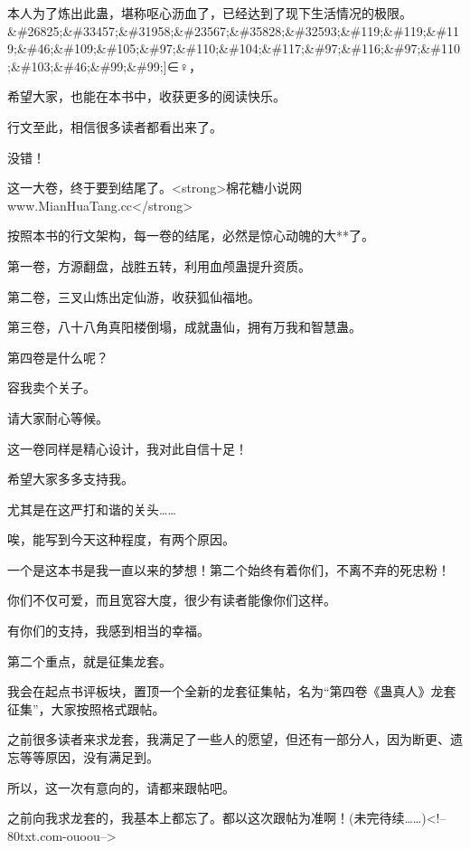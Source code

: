 \begin{this_body}
本人为了炼出此蛊，堪称呕心沥血了，已经达到了现下生活情况的极限。\&\#26825;\&\#33457;\&\#31958;\&\#23567;\&\#35828;\&\#32593;\&\#119;\&\#119;\&\#119;\&\#46;\&\#109;\&\#105;\&\#97;\&\#110;\&\#104;\&\#117;\&\#97;\&\#116;\&\#97;\&\#110;\&\#103;\&\#46;\&\#99;\&\#99;]∈♀，

希望大家，也能在本书中，收获更多的阅读快乐。

行文至此，相信很多读者都看出来了。

没错！

这一大卷，终于要到结尾了。<strong>棉花糖小说网www.MianHuaTang.cc</strong>

按照本书的行文架构，每一卷的结尾，必然是惊心动魄的大**了。

第一卷，方源翻盘，战胜五转，利用血颅蛊提升资质。

第二卷，三叉山炼出定仙游，收获狐仙福地。

第三卷，八十八角真阳楼倒塌，成就蛊仙，拥有万我和智慧蛊。

第四卷是什么呢？

容我卖个关子。

请大家耐心等候。

这一卷同样是精心设计，我对此自信十足！

希望大家多多支持我。

尤其是在这严打和谐的关头……

唉，能写到今天这种程度，有两个原因。

一个是这本书是我一直以来的梦想！第二个始终有着你们，不离不弃的死忠粉！

你们不仅可爱，而且宽容大度，很少有读者能像你们这样。

有你们的支持，我感到相当的幸福。

第二个重点，就是征集龙套。

我会在起点书评板块，置顶一个全新的龙套征集帖，名为“第四卷《蛊真人》龙套征集”，大家按照格式跟帖。

之前很多读者来求龙套，我满足了一些人的愿望，但还有一部分人，因为断更、遗忘等等原因，没有满足到。

所以，这一次有意向的，请都来跟帖吧。

之前向我求龙套的，我基本上都忘了。都以这次跟帖为准啊！(未完待续……)<!--80txt.com-ouoou-->

\end{this_body}

